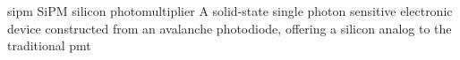 \newglsXacronym%
{sipm}%
{SiPM}%
{silicon photomultiplier}%
{A \gls{solid-state} single photon sensitive electronic device constructed from an avalanche photodiode, offering a silicon analog to the traditional \gls{pmt}}%